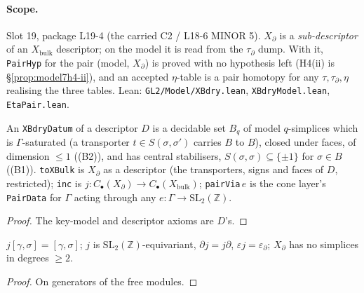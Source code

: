 \paragraph{Scope.} Slot 19, package L19-4 (the carried C2 / L18-6 MINOR 5). $X_\partial$ is a \emph{sub-descriptor} of an
$X_{\mathrm{bulk}}$ descriptor; on the model it is read from the $\tau_\partial$ dump. With it, \texttt{PairHyp} for the pair
(model, $X_\partial$) is proved with no hypothesis left (H4(ii) is \S\ref{prop:model7h4-ii}), and an accepted $\eta$-table is a
pair homotopy for any $\tau,\tau_\partial,\eta$ realising the three tables. Lean: \texttt{GL2/Model/XBdry.lean},
\texttt{XBdryModel.lean}, \texttt{EtaPair.lean}.

\begin{definition}\label{def:xbdry}
  \leanok
  An \texttt{XBdryDatum} of a descriptor $D$ is a decidable set $B_q$ of model $q$-simplices which is $\Gamma$-saturated
  (a transporter $t\in S(\sigma,\sigma')$ carries $B$ to $B$), closed under faces, of dimension $\le1$ ((B2)), and has central
  stabilisers, $S(\sigma,\sigma)\subseteq\{\pm1\}$ for $\sigma\in B$ ((B1)). \texttt{toXBulk} is $X_\partial$ as a descriptor
  (the transporters, signs and faces of $D$, restricted); \texttt{inc} is $j\colon C_\bullet(X_\partial)\to C_\bullet(X_{\mathrm{bulk}})$;
  \texttt{pairVia}\,$e$ is the cone layer's \texttt{PairData} for $\Gamma$ acting through any $e\colon\Gamma\to\mathrm{SL}_2(\mathbb Z)$.
\end{definition}
\begin{proof}
  \leanok
  The key-model and descriptor axioms are $D$'s.
\end{proof}

\begin{theorem}\label{thm:xbdry-pair}
  \leanok
  $j[\gamma,\sigma]=[\gamma,\sigma]$; $j$ is $\mathrm{SL}_2(\mathbb Z)$-equivariant, $\partial j=j\partial$, $\varepsilon j=\varepsilon_\partial$;
  $X_\partial$ has no simplices in degrees $\ge2$.
\end{theorem}
\begin{proof}
  \leanok
  On generators of the free modules.
\end{proof}


